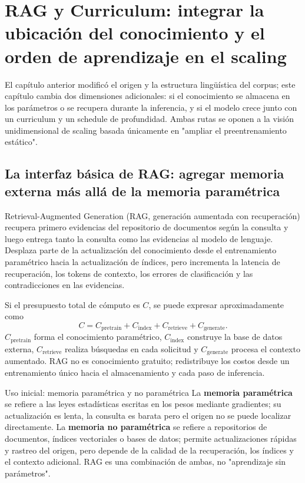 \section{RAG y Curriculum: integrar la ubicación del conocimiento y el orden de aprendizaje en el scaling}

El capítulo anterior modificó el origen y la estructura lingüística del corpus; este capítulo cambia dos dimensiones adicionales: si el conocimiento se almacena en los parámetros o se recupera durante la inferencia, y si el modelo crece junto con un curriculum y un schedule de profundidad. Ambas rutas se oponen a la visión unidimensional de scaling basada únicamente en "ampliar el preentrenamiento estático".

\subsection{La interfaz básica de RAG: agregar memoria externa más allá de la memoria paramétrica}

Retrieval-Augmented Generation (RAG, generación aumentada con recuperación) recupera primero evidencias del repositorio de documentos según la consulta y luego entrega tanto la consulta como las evidencias al modelo de lenguaje. Desplaza parte de la actualización del conocimiento desde el entrenamiento paramétrico hacia la actualización de índices, pero incrementa la latencia de recuperación, los tokens de contexto, los errores de clasificación y las contradicciones en las evidencias.



Si el presupuesto total de cómputo es $C$, se puede expresar aproximadamente como
\[
C=C_{\mathrm{pretrain}}+C_{\mathrm{index}}+C_{\mathrm{retrieve}}+C_{\mathrm{generate}}.
\]
$C_{\mathrm{pretrain}}$ forma el conocimiento paramétrico, $C_{\mathrm{index}}$ construye la base de datos externa, $C_{\mathrm{retrieve}}$ realiza búsquedas en cada solicitud y $C_{\mathrm{generate}}$ procesa el contexto aumentado. RAG no es conocimiento gratuito; redistribuye los costos desde un entrenamiento único hacia el almacenamiento y cada paso de inferencia.

\begin{knowledgebox}{Uso inicial: memoria paramétrica y no paramétrica}
La \textbf{memoria paramétrica} se refiere a las leyes estadísticas escritas en los pesos mediante gradientes; su actualización es lenta, la consulta es barata pero el origen no se puede localizar directamente. La \textbf{memoria no paramétrica} se refiere a repositorios de documentos, índices vectoriales o bases de datos; permite actualizaciones rápidas y rastreo del origen, pero depende de la calidad de la recuperación, los índices y el contexto adicional. RAG es una combinación de ambas, no "aprendizaje sin parámetros".
\end{knowledgebox}

